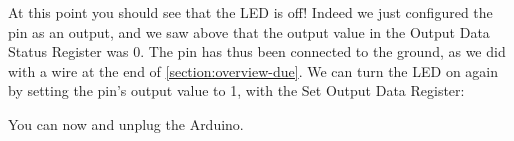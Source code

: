 At this point you should see that the LED is off! Indeed we just configured the
pin as an output, and we saw above that the output value in the Output Data
Status Register was 0. The pin has thus been connected to the ground, as we did
with a wire at the end of \cref{section:overview-due}. We can turn the LED on
again by setting the pin's output value to 1, with the Set Output Data Register:


\noindent You can now  and unplug the Arduino.
